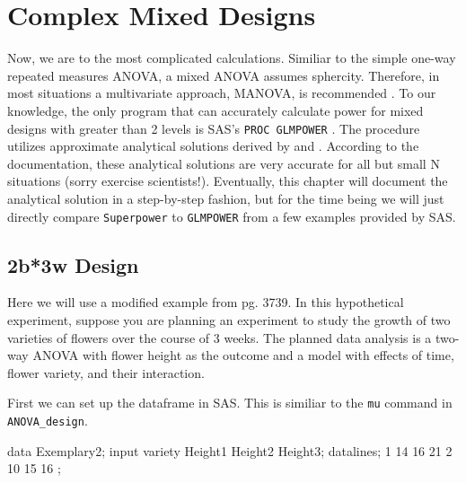 \documentclass[
]{book}
\newenvironment{Shaded}{\begin{snugshade}}{\end{snugshade}}
\newcommand{\DecValTok}[1]{\textcolor[rgb]{0.00,0.00,0.81}{#1}}
\newcommand{\NormalTok}[1]{#1}
\begin{document}
\newpage

\hypertarget{complex-mixed-designs}{%
\section{Complex Mixed Designs}\label{complex-mixed-designs}}

Now, we are to the most complicated calculations. Similiar to the simple one-way repeated measures ANOVA, a mixed ANOVA assumes sphercity. Therefore, in most situations a multivariate approach, MANOVA, is recommended \citep{maxwell_designing_2004}. To our knowledge, the only program that can accurately calculate power for mixed designs with greater than 2 levels is SAS's \texttt{PROC\ GLMPOWER} \citep{SASglmpower}. The procedure utilizes approximate analytical solutions derived by \citet{muller1984practical} and \citet{o1999pragmatic}. According to the documentation, these analytical solutions are very accurate for all but small N situations (sorry exercise scientists!). Eventually, this chapter will document the analytical solution in a step-by-step fashion, but for the time being we will just directly compare \texttt{Superpower} to \texttt{GLMPOWER} from a few examples provided by SAS.

\hypertarget{b3w-design}{%
\subsection{2b*3w Design}\label{b3w-design}}

Here we will use a modified example from \citet{SASglmpower} pg. 3739. In this hypothetical experiment, suppose you are planning an experiment to study the growth of two varieties of flowers over the course of 3 weeks. The planned data analysis is a two-way ANOVA with flower height as the outcome and a model with effects of time, flower variety, and their interaction.

First we can set up the dataframe in SAS. This is similiar to the \texttt{mu} command in \texttt{ANOVA\_design}.

\begin{Shaded}
\begin{Highlighting}[]
\NormalTok{data Exemplary2;}
\NormalTok{input variety Height1 Height2 Height3;}
\NormalTok{datalines;}
\DecValTok{1} \DecValTok{14} \DecValTok{16} \DecValTok{21}
\DecValTok{2} \DecValTok{10} \DecValTok{15} \DecValTok{16}
\NormalTok{;}
\end{Highlighting}
\end{Shaded}
\end{document}

